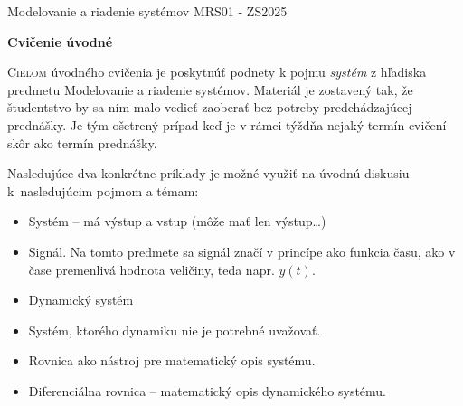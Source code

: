 \documentclass[a4paper, 10pt, ]{article}
\def\oznacenieCasti{MRS01 - ZS2025}
\begin{document}
\lstset{%
style=mystyle,
rangebeginprefix=\#\#\#\ cellB\ ,%
rangebeginsuffix=\ \#\#\#,%
rangeendprefix=\#\#\#\ cellE\ ,%
rangeendsuffix=\ \#\#\#,%
includerangemarker=false,
}






\fontsize{12pt}{22pt}\selectfont

\centerline{\textsf{Modelovanie a riadenie systémov} \hfill \textsf{\oznacenieCasti}}

\fontsize{18pt}{22pt}\selectfont





\begin{flushleft}
	\textbf{\textsf{Cvičenie úvodné}}
\end{flushleft}






\normalsize

\bigskip

{\hypersetup{hidelinks}

\tableofcontents

}

\bigskip

\vspace{18pt}



\noindent
\lettrine[lines=3, nindent=0pt]{C}{ieľom} úvodného cvičenia je poskytnúť podnety k pojmu \emph{systém} z hľadiska predmetu Modelovanie a riadenie systémov. Materiál je zostavený tak, že študentstvo by sa ním malo vedieť zaoberať bez potreby predchádzajúcej prednášky. Je tým ošetrený prípad keď je v rámci týždňa nejaký termín cvičení skôr ako termín prednášky.

\bigskip

\noindent
Nasledujúce dva konkrétne príklady je možné využiť na úvodnú diskusiu k~nasledujúcim pojmom a témam:

\begin{itemize}[leftmargin=0pt, labelsep=1mm, itemsep=-4pt, topsep=0pt, ]
    \item Systém -- má výstup a vstup (môže mať len výstup\ldots)
    \item Signál. Na tomto predmete sa signál značí v princípe ako funkcia času, ako v čase premenlivá hodnota veličiny, teda napr. $y(t)$.
    \item Dynamický systém
    \item Systém, ktorého dynamiku nie je potrebné uvažovať.
    \item Rovnica ako nástroj pre matematický opis systému.
    \item Diferenciálna rovnica -- matematický opis dynamického systému.
\end{itemize}
\end{document}
